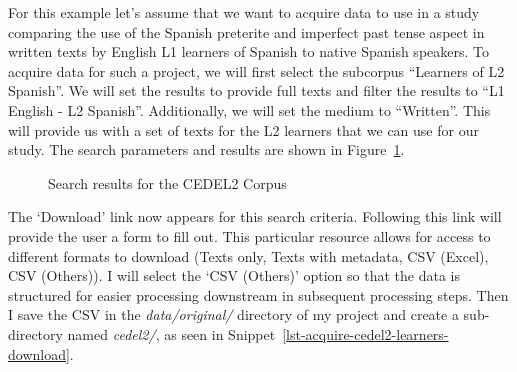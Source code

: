 \documentclass[
  letterpaper,
]{latex/krantz}
\theoremstyle{definition}
\theoremstyle{remark}
\begin{document}
For this example let's assume that we want to acquire data to use in a
study comparing the use of the Spanish preterite and imperfect past
tense aspect in written texts by English L1 learners of Spanish to
native Spanish speakers. To acquire data for such a project, we will
first select the subcorpus ``Learners of L2 Spanish''. We will set the
results to provide full texts and filter the results to ``L1 English -
L2 Spanish''. Additionally, we will set the medium to ``Written''. This
will provide us with a set of texts for the L2 learners that we can use
for our study. The search parameters and results are shown in
Figure~\ref{fig-acquire-cedel2-results}.

\begin{figure}[!htb]


\caption{\label{fig-acquire-cedel2-results}Search results for the CEDEL2
Corpus}

\end{figure}%

The `Download' link now appears for this search criteria. Following this
link will provide the user a form to fill out. This particular resource
allows for access to different formats to download (Texts only, Texts
with metadata, CSV (Excel), CSV (Others)). I will select the `CSV
(Others)' option so that the data is structured for easier processing
downstream in subsequent processing steps. Then I save the CSV in the
\emph{data/original/} directory of my project and create a sub-directory
named \emph{cedel2/}, as seen in
Snippet~\ref{lst-acquire-cedel2-learners-download}.
\end{document}
